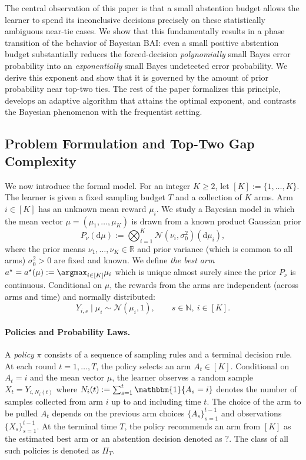 \documentclass[10pt]{article}
\newcommand{\dd}{\mathrm{d}}
\theoremstyle{plain}
\begin{document}
The central observation of this paper is that a small abstention budget allows the learner to spend its inconclusive decisions precisely on these statistically ambiguous near-tie cases. We show that this fundamentally results in a phase transition of  the  behavior of Bayesian
BAI: even a small positive abstention budget  substantially reduces the forced-decision
{\em polynomially} small  Bayes error  probability into an {\em exponentially}  small  Bayes undetected error probability.
We derive this  exponent and show that it is governed by the amount of prior probability near top-two ties. 
The rest of the paper formalizes this principle, develops an adaptive algorithm
that attains the optimal exponent, and contrasts the Bayesian phenomenon with the frequentist setting.

\subsection{Problem Formulation and Top-Two Gap Complexity}
\label{subsec:model-objective}

We now introduce the formal model. For an integer $K\ge 2$, let $[K]:=\{1,\ldots,K\}$. The learner is given a fixed sampling budget $T$ and a collection of $K$ arms.
Arm $i\in[K]$ has an unknown mean reward $\mu_i$. We study a Bayesian model in which the mean vector $\mu=(\mu_1,\ldots,\mu_K)$ is drawn from a known product Gaussian prior
\[
    P_\nu(\dd\mu)
    :=
    \bigotimes_{i=1}^K
    \mathcal N(\nu_i,\sigma_0^2)(\dd\mu_i),
\]
where the prior means $\nu_1,\ldots,\nu_K\in\mathbb R$ and prior variance (which is common to all arms)
$\sigma_0^2>0$ are fixed and known. 
 We define \emph{the best arm} $a^\star=a^\star(\mu):=\argmax_{i\in[K]}\mu_i$ which is unique almost surely since the   prior $P_\nu$ is continuous.
Conditional on $\mu$, the rewards from the arms are independent (across arms and time) and normally distributed:
\[
    Y_{i,s}\mid \mu_i \sim \mathcal N(\mu_i,1),
    \qquad s \in \mathbb{N},~i \in [K].\] 



\paragraph{Policies and Probability Laws.}

A {\em policy} $\pi$ consists of a sequence of sampling rules and a terminal
decision rule. At each round $t=1,\ldots, T$, the policy selects an arm $A_t \in [K]$. Conditional on  $A_t=i$ and the mean vector $\mu$, the learner observes a random sample $X_t=Y_{i, N_i(t)}$ where  $N_i(t):=\sum_{s=1}^t \mathbbm{1}\{A_s=i\}$
denotes the number of samples collected from arm $i$ up to and including time $t$. The choice of the arm to be pulled $A_t$ depends on the previous arm choices $\{A_s\}_{s=1}^{t-1}$ and observations $\{  X_s  \}_{s=1}^{t-1}$. At the terminal time $T$, the policy recommends an arm from $[K]$ as the estimated best arm or an abstention decision denoted as $?$.  The class of all such policies is denoted as $\Pi_T$.
\end{document}
